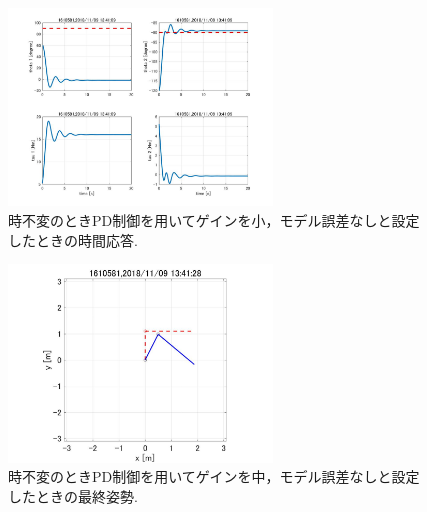 \documentclass[twocolumn, 10pt,a4j]{jsarticle}
\begin{document}
    \begin{figure}[H]
      \begin{center}
        \includegraphics[width=7cm]{../img/img/kansetu_PD_zifuhen_small_no_model_gosa_zikan_outo.jpg}
        \caption{時不変のときPD制御を用いてゲインを小，モデル誤差なしと設定したときの時間応答.}
      \end{center}
    \end{figure}
    \begin{figure}[H]
      \begin{center}
        \includegraphics[width=7cm]{../img/img/kansetu_PD_zifuhen_chu_no_model_gosa_saisyu_sisei.jpg}
        \caption{時不変のときPD制御を用いてゲインを中，モデル誤差なしと設定したときの最終姿勢.}
      \end{center}
    \end{figure}
\end{document}
